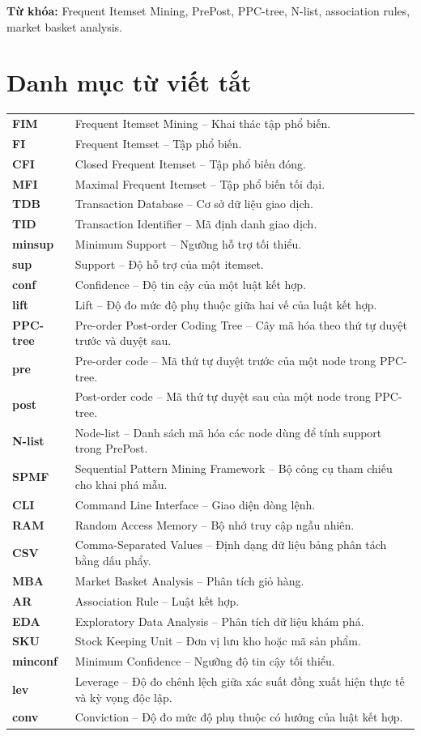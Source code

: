 \documentclass[12pt,a4paper]{article}
\begin{document}
\textbf{Từ khóa:} Frequent Itemset Mining, PrePost, PPC-tree, N-list, association rules,
market basket analysis.

\newpage

\section*{Danh mục từ viết tắt}

\begin{longtable}{>{\bfseries}p{3cm}p{11cm}}
FIM & Frequent Itemset Mining -- Khai thác tập phổ biến. \\
FI & Frequent Itemset -- Tập phổ biến. \\
CFI & Closed Frequent Itemset -- Tập phổ biến đóng. \\
MFI & Maximal Frequent Itemset -- Tập phổ biến tối đại. \\
TDB & Transaction Database -- Cơ sở dữ liệu giao dịch. \\
TID & Transaction Identifier -- Mã định danh giao dịch. \\
minsup & Minimum Support -- Ngưỡng hỗ trợ tối thiểu. \\
sup & Support -- Độ hỗ trợ của một itemset. \\
conf & Confidence -- Độ tin cậy của một luật kết hợp. \\
lift & Lift -- Độ đo mức độ phụ thuộc giữa hai vế của luật kết hợp. \\
PPC-tree & Pre-order Post-order Coding Tree -- Cây mã hóa theo thứ tự duyệt trước và duyệt sau. \\
pre & Pre-order code -- Mã thứ tự duyệt trước của một node trong PPC-tree. \\
post & Post-order code -- Mã thứ tự duyệt sau của một node trong PPC-tree. \\
N-list & Node-list -- Danh sách mã hóa các node dùng để tính support trong PrePost. \\
SPMF & Sequential Pattern Mining Framework -- Bộ công cụ tham chiếu cho khai phá mẫu. \\
CLI & Command Line Interface -- Giao diện dòng lệnh. \\
RAM & Random Access Memory -- Bộ nhớ truy cập ngẫu nhiên. \\
CSV & Comma-Separated Values -- Định dạng dữ liệu bảng phân tách bằng dấu phẩy. \\
MBA & Market Basket Analysis -- Phân tích giỏ hàng. \\
AR & Association Rule -- Luật kết hợp. \\
EDA & Exploratory Data Analysis -- Phân tích dữ liệu khám phá. \\
SKU & Stock Keeping Unit -- Đơn vị lưu kho hoặc mã sản phẩm. \\
minconf & Minimum Confidence -- Ngưỡng độ tin cậy tối thiểu. \\
lev & Leverage -- Độ đo chênh lệch giữa xác suất đồng xuất hiện thực tế và kỳ vọng độc lập. \\
conv & Conviction -- Độ đo mức độ phụ thuộc có hướng của luật kết hợp. \\
\end{longtable}
\end{document}
